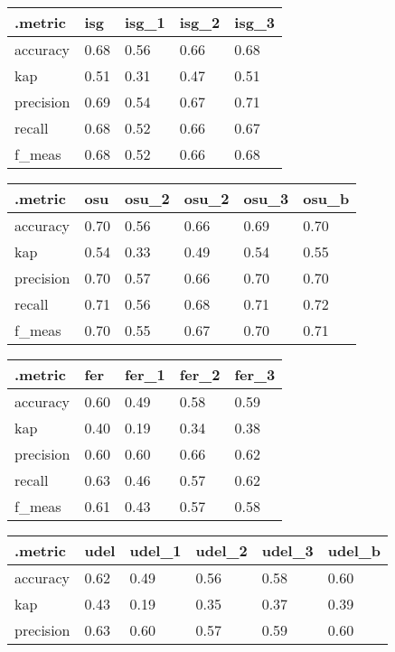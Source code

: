 \begin{table}[htbp]
\centering

\begin{tabular}{|l|llll|}
  \hline
.metric & isg & isg\_1 & isg\_2 & isg\_3 \\ 
  \hline
accuracy & 0.68 & 0.56 & 0.66 & 0.68 \\ 
  kap & 0.51 & 0.31 & 0.47 & 0.51 \\ 
  precision & 0.69 & 0.54 & 0.67 & 0.71 \\ 
  recall & 0.68 & 0.52 & 0.66 & 0.67 \\ 
  f\_meas & 0.68 & 0.52 & 0.66 & 0.68 \\ 
   \hline
\end{tabular}
\begin{tabular}{|l|lllll|}
  \hline
.metric & osu & osu\_2 & osu\_2 & osu\_3 & osu\_b \\ 
  \hline
accuracy & 0.70 & 0.56 & 0.66 & 0.69 & 0.70 \\ 
  kap & 0.54 & 0.33 & 0.49 & 0.54 & 0.55 \\ 
  precision & 0.70 & 0.57 & 0.66 & 0.70 & 0.70 \\ 
  recall & 0.71 & 0.56 & 0.68 & 0.71 & 0.72 \\ 
  f\_meas & 0.70 & 0.55 & 0.67 & 0.70 & 0.71 \\ 
   \hline
\end{tabular}
\begin{tabular}{|l|llll|}
  \hline
.metric & fer & fer\_1 & fer\_2 & fer\_3 \\ 
  \hline
accuracy & 0.60 & 0.49 & 0.58 & 0.59 \\ 
  kap & 0.40 & 0.19 & 0.34 & 0.38 \\ 
  precision & 0.60 & 0.60 & 0.66 & 0.62 \\ 
  recall & 0.63 & 0.46 & 0.57 & 0.62 \\ 
  f\_meas & 0.61 & 0.43 & 0.57 & 0.58 \\ 
   \hline
\end{tabular}
\begin{tabular}{|l|lllll|}
  \hline
.metric & udel & udel\_1 & udel\_2 & udel\_3 & udel\_b \\ 
  \hline
accuracy & 0.62 & 0.49 & 0.56 & 0.58 & 0.60 \\ 
  kap & 0.43 & 0.19 & 0.35 & 0.37 & 0.39 \\ 
  precision & 0.63 & 0.60 & 0.57 & 0.59 & 0.60 \\ 

\end{tabular}
\end{table}
